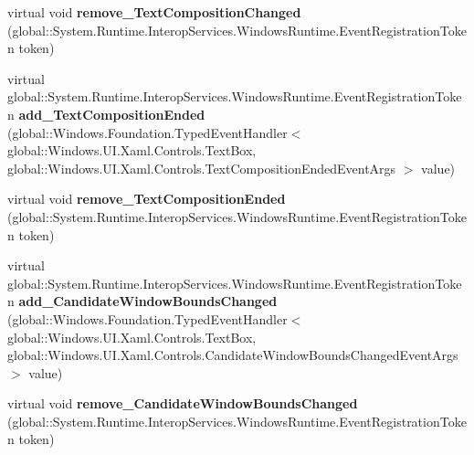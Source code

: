 \begin{DoxyCompactItemize}
\item 
\mbox{\label{class_windows_1_1_u_i_1_1_xaml_1_1_controls_1_1_text_box_ae941b45f52cc8e88d708275c4313ef9a}} 
virtual void {\bfseries remove\+\_\+\+Text\+Composition\+Changed} (global\+::\+System.\+Runtime.\+Interop\+Services.\+Windows\+Runtime.\+Event\+Registration\+Token token)
\item 
\mbox{\label{class_windows_1_1_u_i_1_1_xaml_1_1_controls_1_1_text_box_a1ec5fb1c372d817e2d83ca0f4160361d}} 
virtual global\+::\+System.\+Runtime.\+Interop\+Services.\+Windows\+Runtime.\+Event\+Registration\+Token {\bfseries add\+\_\+\+Text\+Composition\+Ended} (global\+::\+Windows.\+Foundation.\+Typed\+Event\+Handler$<$ global\+::\+Windows.\+U\+I.\+Xaml.\+Controls.\+Text\+Box, global\+::\+Windows.\+U\+I.\+Xaml.\+Controls.\+Text\+Composition\+Ended\+Event\+Args $>$ value)
\item 
\mbox{\label{class_windows_1_1_u_i_1_1_xaml_1_1_controls_1_1_text_box_a5973df0b80c264046f580c78b04aeb61}} 
virtual void {\bfseries remove\+\_\+\+Text\+Composition\+Ended} (global\+::\+System.\+Runtime.\+Interop\+Services.\+Windows\+Runtime.\+Event\+Registration\+Token token)
\item 
\mbox{\label{class_windows_1_1_u_i_1_1_xaml_1_1_controls_1_1_text_box_a0f417de69db14b9dda18a6b486367ec7}} 
virtual global\+::\+System.\+Runtime.\+Interop\+Services.\+Windows\+Runtime.\+Event\+Registration\+Token {\bfseries add\+\_\+\+Candidate\+Window\+Bounds\+Changed} (global\+::\+Windows.\+Foundation.\+Typed\+Event\+Handler$<$ global\+::\+Windows.\+U\+I.\+Xaml.\+Controls.\+Text\+Box, global\+::\+Windows.\+U\+I.\+Xaml.\+Controls.\+Candidate\+Window\+Bounds\+Changed\+Event\+Args $>$ value)
\item 
\mbox{\label{class_windows_1_1_u_i_1_1_xaml_1_1_controls_1_1_text_box_a69264830074f27caa404569cb91f24af}} 
virtual void {\bfseries remove\+\_\+\+Candidate\+Window\+Bounds\+Changed} (global\+::\+System.\+Runtime.\+Interop\+Services.\+Windows\+Runtime.\+Event\+Registration\+Token token)
\item 

\end{DoxyCompactItemize}
